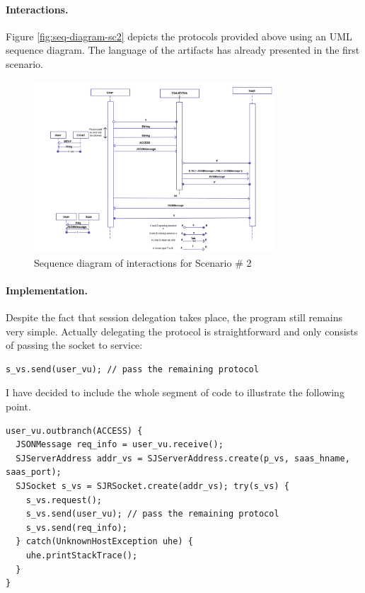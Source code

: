 \documentclass[a4paper]{easychair}
\begin{document}
\paragraph{Interactions.} Figure \ref{fig:seq-diagram-sc2} depicts the protocols provided above using an UML sequence diagram. The language of the artifacts has already presented in the first scenario.

\begin{figure}
\label{fig:seq-diagram-sc2}
\centering
\includegraphics[width=0.8\textwidth]{interaction-sc2.png}
\caption{Sequence diagram of interactions for Scenario \# 2}
\label{fig:}
\end{figure}

\paragraph{Implementation.} Despite the fact that session delegation takes place, the program still remains very simple. Actually delegating the protocol is straightforward and only consists of passing the socket to service:

\begin{lstlisting}
s_vs.send(user_vu); // pass the remaining protocol
\end{lstlisting}

I have decided to include the whole segment of code to illustrate the following point. 

\begin{lstlisting}
user_vu.outbranch(ACCESS) {
  JSONMessage req_info = user_vu.receive();
  SJServerAddress addr_vs = SJServerAddress.create(p_vs, saas_hname, saas_port);
  SJSocket s_vs = SJRSocket.create(addr_vs); try(s_vs) {
    s_vs.request();
    s_vs.send(user_vu); // pass the remaining protocol    
    s_vs.send(req_info);
  } catch(UnknownHostException uhe) {
    uhe.printStackTrace(); 
  }
}
\end{lstlisting}
\end{document}
